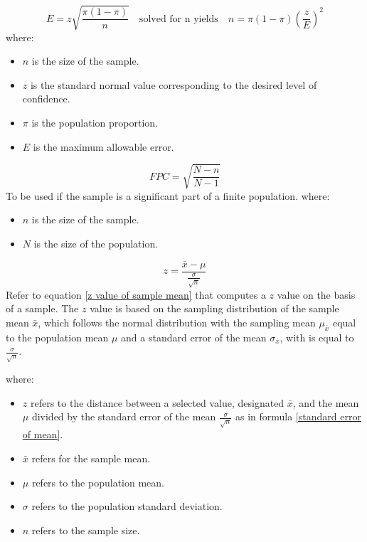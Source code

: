\begin{equation}
\label{sample size for the population proportion}
E = z\sqrt{\frac{\pi (1 - \pi)}{n}} \quad \text{solved for n yields} \quad n = \pi (1-\pi)(\frac{z}{E})^2
\end{equation}
where:
\begin{itemize}
 \item $n$ is the size of the sample.
 \item $z$ is the standard normal value corresponding to the desired level of confidence.
 \item $\pi$ is the population proportion.
 \item $E$ is the maximum allowable error.
\end{itemize}
\hformbar


\begin{equation}
\label{finite -population correction factor}
FPC = \sqrt{\frac{N - n}{N - 1}}
\end{equation}
To be used if the sample is a significant part of a finite population.
where:
\begin{itemize}
 \item $n$ is the size of the sample.
 \item $N$ is the size of the population.
\end{itemize} 
\hformbar


\begin{equation}
\label{testing a mean sigma known}
z = \frac{\bar{x}-\mu}{\frac{\sigma}{\sqrt{n}}}
\end{equation}
Refer to equation \eqref{z value of sample mean} that computes a $z$ value on the basis of a sample.\newline
The $z$ value is based on the sampling distribution of the sample mean $\bar{x}$, which follows the normal distribution with the sampling mean $\mu_{\bar{x}}$ equal to the population mean $\mu$ and a standard error of the mean $\sigma_{\bar{x}}$, with is equal to $\frac{\sigma}{\sqrt{n}}$.

where: 
\begin{itemize}
 \item $z$ refers to the distance between a selected value, designated $\bar{x}$, and the 
mean $\mu$ divided by the standard error of the mean $\frac{\sigma}{\sqrt{n}}$ as in formula \eqref{standard error of mean}.
 \item $\bar{x}$ refers for the sample mean.
 \item $\mu$ refers to the population mean.
 \item $\sigma$ refers to the population standard deviation.
 \item $n$ refers to the sample size. 
\end{itemize}
\hformbar


